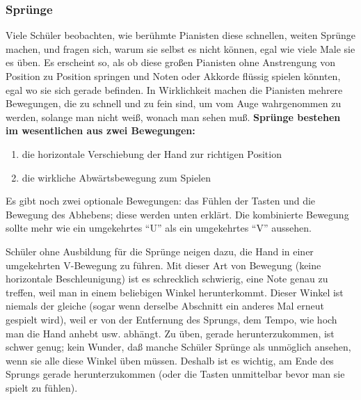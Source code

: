 
\subsubsection{Sprünge}
\label{c1iii7f}

Viele Schüler beobachten, wie berühmte Pianisten diese schnellen, weiten Sprünge machen, und fragen sich, warum sie selbst es nicht können, egal wie viele Male sie es üben.
Es erscheint so, als ob diese großen Pianisten ohne Anstrengung von Position zu Position springen und Noten oder Akkorde flüssig spielen könnten, egal wo sie sich gerade befinden.
In Wirklichkeit machen die Pianisten mehrere Bewegungen, die zu schnell und zu fein sind, um vom Auge wahrgenommen zu werden, solange man nicht weiß, wonach man sehen muß.
\textbf{Sprünge bestehen im wesentlichen aus zwei Bewegungen:}

\begin{enumerate}[label={\arabic*.}] 
 \item die horizontale Verschiebung der Hand zur richtigen Position
 \item die wirkliche Abwärtsbewegung zum Spielen
\end{enumerate}

Es gibt noch zwei optionale Bewegungen: das Fühlen der Tasten und die Bewegung des Abhebens; diese werden unten erklärt.
Die kombinierte Bewegung sollte mehr wie ein umgekehrtes \enquote{U} als ein umgekehrtes \enquote{V} aussehen.

Schüler ohne Ausbildung für die Sprünge neigen dazu, die Hand in einer umgekehrten V-Bewegung zu führen.
Mit dieser Art von Bewegung (keine horizontale Beschleunigung) ist es schrecklich schwierig, eine Note genau zu treffen, weil man in einem beliebigen Winkel herunterkommt.
Dieser Winkel ist niemals der gleiche (sogar wenn derselbe Abschnitt ein anderes Mal erneut gespielt wird), weil er von der Entfernung des Sprungs, dem Tempo, wie hoch man die Hand anhebt usw. abhängt.
Zu üben, gerade herunterzukommen, ist schwer genug; kein Wunder, daß manche Schüler Sprünge als unmöglich ansehen, wenn sie alle diese Winkel üben müssen.
Deshalb ist es wichtig, am Ende des Sprungs gerade herunterzukommen (oder die Tasten unmittelbar bevor man sie spielt zu fühlen).

